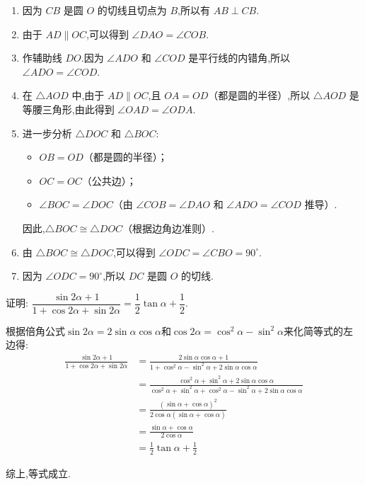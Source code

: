 \begin{questions}
	\begin{solution}
		\begin{enumerate}[label=\protect\circled{\arabic*}]
			\item 因为 $CB$ 是圆 $O$ 的切线且切点为 $B$,所以有 $AB \perp CB$.
			\item 由于 $AD \parallel OC$,可以得到 $\angle DAO = \angle COB$.
			\item 作辅助线 $DO$.因为 $\angle ADO$ 和 $\angle COD$ 是平行线的内错角,所以 $\angle ADO = \angle COD$.
			\item 在 $\triangle AOD$ 中,由于 $AD \parallel OC$,且 $OA = OD$（都是圆的半径）,所以 $\triangle AOD$ 是等腰三角形,由此得到 $\angle OAD = \angle ODA$.
			\item 进一步分析 $\triangle DOC$ 和 $\triangle BOC$:
			      \begin{itemize}
				      \item $OB = OD$（都是圆的半径）；
				      \item $OC = OC$（公共边）；
				      \item $\angle BOC = \angle DOC$（由 $\angle COB = \angle DAO$ 和 $\angle ADO = \angle COD$ 推导）.
			      \end{itemize}
			      因此,$\triangle BOC \cong \triangle DOC$（根据边角边准则）.
			\item 由 $\triangle BOC \cong \triangle DOC$,可以得到 $\angle ODC = \angle CBO = 90^\circ$.
			\item 因为 $\angle ODC = 90^\circ$,所以 $DC$ 是圆 $O$ 的切线.
		\end{enumerate}
	\end{solution}
	\pagebreak
	\question[10] 证明: $\dfrac{\sin2\alpha + 1}{1+\cos2\alpha + \sin2\alpha} = \dfrac12\tan\alpha + \dfrac12$.
	\begin{proofsolution}
		\begin{cenum}
			\item 根据倍角公式$\sin2\alpha = 2\sin\alpha\cos\alpha$和$\cos2\alpha=\cos^2\alpha -
				      \sin^2\alpha$来化简等式的左边得:
			      \begin{align*}
				      \frac{\sin2\alpha + 1}{1+\cos2\alpha + \sin2\alpha}
				       & = \frac{2\sin\alpha\cos\alpha + 1}{1 + \cos^2\alpha - \sin^2\alpha + 2\sin\alpha\cos\alpha} \\
				       & = \frac{\cos^2\alpha + \sin^2\alpha + 2\sin\alpha\cos\alpha}{\cos^2\alpha + \sin^2\alpha +
				      \cos^2\alpha - \sin^2\alpha + 2\sin\alpha\cos\alpha}                                           \\
				       & = \frac{(\sin\alpha + \cos\alpha)^2}{2\cos\alpha(\sin\alpha + \cos\alpha)}                  \\
				       & = \frac{\sin\alpha + \cos\alpha}{2\cos\alpha}                                               \\
				       & = \frac12\tan\alpha + \frac12
			      \end{align*}
			\item 综上,等式成立.
		\end{cenum}
	\end{proofsolution}


\end{questions}
